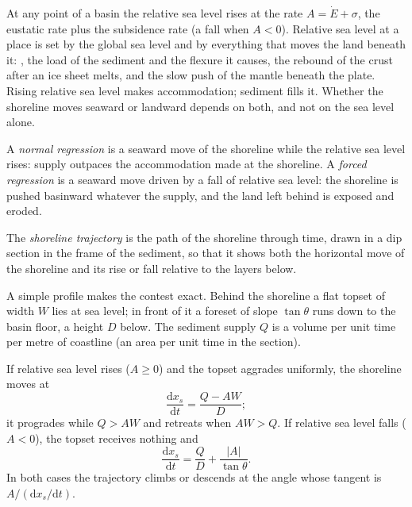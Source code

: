 At any point of a basin the relative sea level rises at the rate $A = \dot E
+ \sigma$, the eustatic rate plus the subsidence rate (a fall when $A < 0$).
Relative sea level at a place is set by the global sea level and by
everything that moves the land beneath it: , the load of
the sediment and the flexure it causes, the rebound of the crust after an ice
sheet melts, and the slow push of the mantle beneath the plate. Rising
relative sea level makes accommodation; sediment fills it. Whether the
shoreline moves seaward or landward depends on both, and not on the sea level
alone.

\begin{definition}\label{def:b3:sequence-stratigraphy:regression}
A \emph{normal regression} is a seaward move of the
shoreline while the relative sea level rises: supply outpaces the
accommodation made at the shoreline. A \emph{forced regression}
is a seaward move driven by a fall of relative sea level: the
shoreline is pushed basinward whatever the supply, and the land left behind
is exposed and eroded.
\end{definition}

\begin{definition}\label{def:b3:sequence-stratigraphy:trajectory}
The \emph{shoreline trajectory} is the path of
the shoreline through time, drawn in a dip section in the frame of the
sediment, so that it shows both the horizontal move of the shoreline and its
rise or fall relative to the layers below.
\end{definition}

A simple profile makes the contest exact. Behind the shoreline a flat topset
of width $W$ lies at sea level; in front of it a foreset of slope
$\tan\theta$ runs down to the basin floor, a height $D$ below. The sediment
supply $Q$ is a volume per unit time per metre of coastline (an area per unit
time in the section).

\begin{proposition}\label{prop:b3:sequence-stratigraphy:trajectory}
If relative sea level rises ($A \ge 0$) and the topset aggrades uniformly,
the shoreline moves at
\[
\frac{\mathrm dx_s}{\mathrm dt} = \frac{Q - AW}{D};
\]
it progrades while $Q > AW$ and retreats when $AW > Q$. If relative sea level
falls ($A < 0$), the topset receives nothing and
\[
\frac{\mathrm dx_s}{\mathrm dt} = \frac{Q}{D} + \frac{|A|}{\tan\theta}.
\]
In both cases the trajectory climbs or descends at the angle whose tangent is
$A/(\mathrm dx_s/\mathrm dt)$.
\end{proposition}

